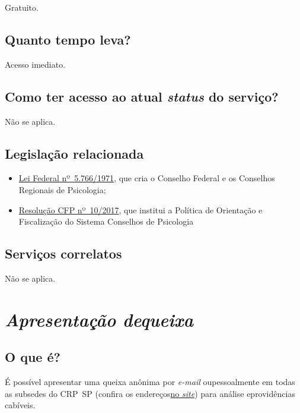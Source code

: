 Gratuito.

\section{Quanto tempo leva?}

Acesso imediato.

\section{Como ter acesso ao atual \emph{status} do serviço?}

Não se aplica.

\section{Legislação relacionada}

\begin{itemize}
  \item  \href{http://www.planalto.gov.br/ccivil_03/leis/l5766.htm}{Lei Federal  nº~5.766/1971}, que cria o Conselho Federal e os Conselhos Regionais  de Psicologia;
  \item  \href{https://transparencia.cfp.org.br/wp-content/uploads/sites/10/2017/07/Resolu\%C3\%A7\%C3\%A3o-CFP-010-2017-Politica-de-Orienta\%C3\%A7\%C3\%A3o-e-Fiscaliza\%C3\%A7\%C3\%A3o-dos-Conselhos.pdf}{Resolução  CFP nº~10/2017}, que institui a Política de Orientação e Fiscalização  do Sistema Conselhos de Psicologia
\end{itemize}

\section{Serviços correlatos}

Não se aplica.

\chapter{\texorpdfstring{\emph{Apresentação dequeixa}}{Apresentação de queixa}}


\section{O que é?}

É possível apresentar uma queixa anônima por \emph{e-mail} oupessoalmente em todas as subsedes do CRP~SP (confira os endereços\href{https://www.crpsp.org/sede/index}{no \emph{site}}) para análise eprovidências cabíveis.

